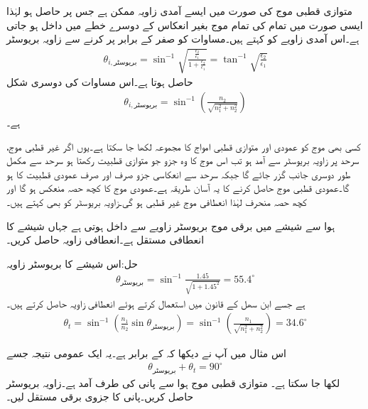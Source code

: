 متوازی قطبی موج کی صورت میں ایسے آمدی زاویہ ممکن ہے جس پر   حاصل ہو لہٰذا ایسی صورت میں تمام کی تمام موج بغیر انعکاس کے دوسرے خطے میں داخل ہو جاتی ہے۔اس آمدی زاویے کو  کہتے ہیں۔مساوات  کو صفر کے برابر پر کرنے سے زاویہ بریوسٹر 
\begin{align}
\theta_{i,\text{بریوسٹر}} =\sin^{-1} \sqrt{\frac{\frac{\epsilon_2}{\epsilon_1}}{1+\frac{\epsilon_2}{\epsilon_1}}}=\tan^{-1} \sqrt{\frac{\epsilon_2}{\epsilon_1}}
\end{align} 
حاصل ہوتا ہے۔اس مساوات کی دوسری شکل
\begin{align}
\theta_{i,\text{بریوسٹر}}= \sin^{-1} \left(\frac{n_2}{\sqrt{n_1^2+n_2^2}}\right)
\end{align}
ہے۔

کسی بھی موج کو عمودی اور متوازی قطبی امواج کا مجموعہ لکھا جا سکتا ہے۔یوں اگر غیر قطبی موج، سرحد پر  زاویہ بریوسٹر سے آمد ہو تب اس موج کا وہ جزو جو متوازی قطبیت رکھتا ہو سرحد سے مکمل طور دوسری جانب گزر جائے گا جبکہ سرحد سے انعکاسی جزو صرف اور صرف عمودی قطبیت کا ہو گا۔عمودی قطبی موج حاصل کرنے کا یہ آسان طریقہ ہے۔عمودی موج کا کچھ حصہ منعکس ہو گا اور کچھ حصہ منحرف لہٰذا انعطافی موج غیر قطبی ہو گی۔زاویہ بریوسٹر کو  بھی کہتے ہیں۔  

ہوا سے شیشے  میں برقی موج بریوسٹر زاویے سے داخل ہوتی ہے جہاں شیشے کا انعطافی مستقل  ہے۔انعطافی زاویہ حاصل کریں۔

حل:اس شیشے کا بریوسٹر زاویہ
\begin{align*}
\theta_{\text{بریوسٹر}} = \sin^{-1} \frac{1.45}{\sqrt{1+1.45^2}}=55.4^{\circ}
\end{align*}
ہے جسے ابن سھل کے قانون میں استعمال کرتے ہوئے انعطافی زاویہ حاصل کرتے ہیں۔
\begin{align*}
\theta_t=\sin^{-1} \left(\frac{n_1}{n_2} \sin \theta_{\text{بریوسٹر}} \right)=\sin^{-1} \left(\frac{n_1}{\sqrt{n_1^2+n_2^2}}\right)=34.6^{\circ}
\end{align*}

اس مثال میں آپ نے دیکھا کہ  کے برابر ہے۔یہ ایک عمومی نتیجہ جسے
\begin{align}
\theta_{\text{بریوسٹر}} +\theta_{t}=90^{\circ}
\end{align}
لکھا جا سکتا ہے۔
متوازی قطبی موج ہوا سے پانی کی طرف آمد ہے۔زاویہ بریوسٹر حاصل کریں۔پانی کا جزوی برقی مستقل  لیں۔

